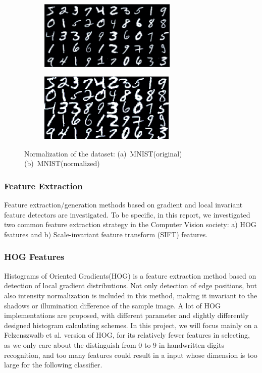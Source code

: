 \documentclass[12pt]{article}
\begin{document}
\begin{figure}[tbp]
	\centering
	\begin{subfigure}{.45\textwidth}
		\includegraphics[height = 1.3in]{MNIST}		
		\caption{ }
	\end{subfigure}
	\begin{subfigure}{.45\textwidth}
		\includegraphics[height = 1.3in]{MNIST_norm}		
		\caption{ }
	\end{subfigure}
	\caption{Normalization of the dataset: (a)~MNIST(original) (b)~MNIST(normalized)}
	\label{fig:norm}
\end{figure}

\subsubsection{Feature Extraction}
Feature extraction/generation methods based on gradient and local invariant feature detectors are investigated. To be specific, in this report, we investigated two common feature extraction strategy in the Computer Vision society: a) HOG features and b) Scale-invariant feature transform (SIFT) features.

\subsubsection*{HOG Features}
 Histograms of Oriented Gradients(HOG)\cite{dalal2005histograms}\cite{felzenszwalb2010object} is a feature extraction method based on detection of local gradient distributions. Not only detection of edge positions, but also intensity normalization is included in this method, making it invariant to the shadows or illumination difference of the sample image. A lot of HOG implementations are proposed, with different parameter and slightly differently designed histogram calculating schemes. In this project, we will focus mainly on a Felzenszwalb et al.\cite{felzenszwalb2010object} version of HOG, for its relatively fewer features in selecting, as we only care about the distinguish from 0 to 9 in handwritten digits recognition, and too many features could result in a input whose dimension is too large for the following classifier.
\end{document}
